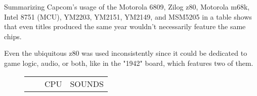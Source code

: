 Summarizing Capcom's usage of the Motorola 6809, Zilog z80, Motorola m68k, Intel 8751 (MCU), YM2203, YM2151, YM2149, and MSM5205 in a table shows that even titles produced the same year wouldn't necessarily feature the same chips. 

Even the ubiquitous z80 was used inconsistently since it could be dedicated to game logic, audio, or both, like in the "1942" board, which features two of them.



\begin{figure}[H]
{ 
\setlength{\tabcolsep}{3.0pt}
\setlength\cmidrulewidth{\heavyrulewidth} %
\begin{tabularx}{\textwidth}{Xccccccccc}

  & & \multicolumn{4}{c}{CPU} &  \multicolumn{4}{c}{SOUNDS} \\
  \cmidrule(lr){3-6}
  \cmidrule(lr){7-10}
 

\end{tabularx}}
\end{figure}
